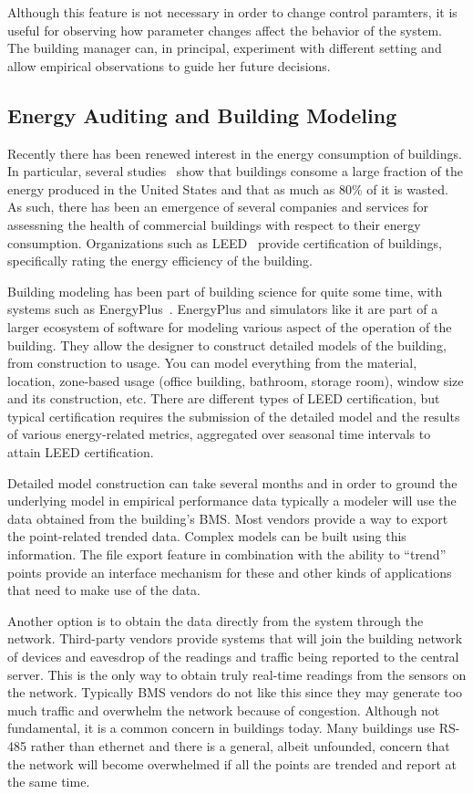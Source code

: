 Although this feature is not necessary in order to change control paramters, it is useful for observing how parameter changes
affect the behavior of the system.  The building manager can, in principal, experiment with different setting and allow
empirical observations to guide her future decisions.


\subsection{Energy Auditing and Building Modeling}
Recently there has been renewed interest in the energy consumption of buildings.  In particular, several studies~\cite{BuildingEnergyData,
MITBuildingScience} show that buildings consome a large fraction of the energy produced in the United States and that as much
as 80\% of it is wasted.  As such, there has been an emergence of several companies and services for assessning the health of
commercial buildings with respect to their energy consumption.  Organizations such as LEED~\cite{Leed} provide certification of 
buildings, specifically rating the energy efficiency of the building.

Building modeling has been part of building science for quite some time, with systems such as EnergyPlus~\cite{EnergyPlus}.
EnergyPlus and simulators like it are part of a larger ecosystem of software for modeling various aspect of the operation
of the building.  They allow the designer to construct detailed models of the building, from construction to usage.  You can
model everything from the material, location, zone-based usage (office building, bathroom, storage room), window size and its
construction, etc.  There are different types of LEED certification, but typical certification requires the submission of the detailed
model and the results of various energy-related metrics, aggregated over seasonal time intervals to attain LEED certification.

Detailed model construction can take several months and in order to ground the underlying model in empirical performance data
typically a modeler will use the data obtained from the building's BMS.  Most vendors provide a way to export the point-related 
trended data.  Complex models can be built using this information.  The file export feature in combination with the ability to 
``trend'' points provide an interface mechanism for these and other kinds of applications that need to make use of the data.

Another option is to obtain the data directly from the system through the network.  Third-party vendors provide systems that 
will join the building network of devices and eavesdrop of the readings and traffic being reported to the central server.
This is the only way to obtain truly real-time readings from the sensors on the network.
Typically BMS vendors do not like this since they may generate too much traffic and overwhelm the network because of congestion.
Although not fundamental, it is a common concern in buildings today.  Many buildings use RS-485 rather than ethernet and there is
a general, albeit unfounded, concern that the network will become overwhelmed if all the points are trended and report at the same
time.

